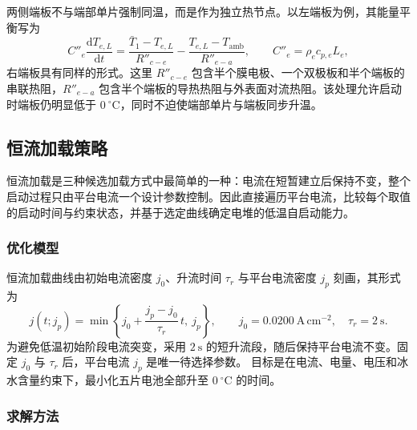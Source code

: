 \documentclass{gmcmthesis}
\begin{document}
两侧端板不与端部单片强制同温，而是作为独立热节点。以左端板为例，其能量平衡写为
\begin{equation}
  C''_{e}\frac{\mathrm d T_{e,L}}{\mathrm dt}
  =\frac{\bar T_1-T_{e,L}}{R''_{c-e}}
  -\frac{T_{e,L}-T_{\mathrm{amb}}}{R''_{e-a}},
  \qquad
  C''_{e}=\rho_e c_{p,e}L_e,
  \label{eq:q2-endplate}
\end{equation}
右端板具有同样的形式。这里 $R''_{c-e}$ 包含半个膜电极、一个双极板和半个端板的串联热阻，$R''_{e-a}$ 包含半个端板的导热热阻与外表面对流热阻。该处理允许启动时端板仍明显低于 $0~^{\circ}\mathrm{C}$，同时不迫使端部单片与端板同步升温。


\subsection{恒流加载策略}
\label{subsec:q2-cc}

恒流加载是三种候选加载方式中最简单的一种：电流在短暂建立后保持不变，整个启动过程只由平台电流一个设计参数控制。因此直接遍历平台电流，比较每个取值的启动时间与约束状态，并基于选定曲线确定电堆的低温自启动能力。

\subsubsection{优化模型}
\label{subsec:q2-cc-model}

恒流加载曲线由初始电流密度 $j_0$、升流时间 $\tau_r$ 与平台电流密度 $j_p$ 刻画，其形式为
\begin{equation}
  j(t;j_p)=\min\left\{j_0+\frac{j_p-j_0}{\tau_r}\,t,\ j_p\right\},
  \qquad j_0=0.0200~\mathrm{A\,cm^{-2}},\quad \tau_r=2~\mathrm{s}.
  \label{eq:q2-cc-current}
\end{equation}
为避免低温初始阶段电流突变，采用 $2~\mathrm{s}$ 的短升流段，随后保持平台电流不变。固定 $j_0$ 与 $\tau_r$ 后，平台电流 $j_p$ 是唯一待选择参数。
目标是在电流、电量、电压和冰水含量约束下，最小化五片电池全部升至 $0~^{\circ}\mathrm{C}$ 的时间。

\subsubsection{求解方法}
\label{subsec:q2-cc-method}
\end{document}
